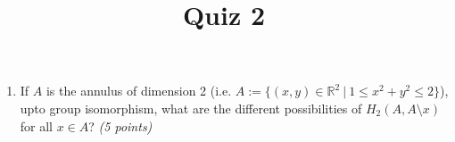 \documentclass{article}
\title{Quiz 2}
\begin{document}
\maketitle
\begin{enumerate}
\item If $A$ is the annulus of dimension 2 (i.e. $A:=\{(x,y)\in \mathbb{R}^2 \ |\ 1 \leq x^2 + y^2 \leq 2\}$), upto group isomorphism, what are the different possibilities of $H_2(A,A\setminus x)$ for all $x \in A$? \emph{(5 points)}
\end{enumerate}
\end{document}
